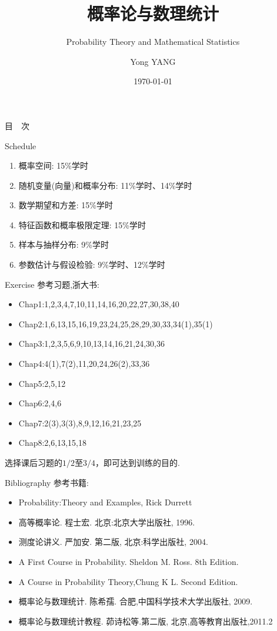 \documentclass[aspectratio=43]{beamer}
\title{概率论与数理统计} %
\subtitle{Probability Theory and Mathematical Statistics}
\author[YY]{Yong YANG}
\institute[BUPT]{
	School of Information and Communication Engineering%
	\\%
	Beijing University of Posts and Telecommunications%
} %
\date{\today}%
\begin{document}
	
	\frame{\titlepage}
	\begin{frame}{目$\quad$次}
	\tableofcontents   
\end{frame}

\begin{frame}{Schedule}
\begin{enumerate}
	\item \alert{概率空间}: 15\%学时
	\item \alert{随机变量(向量)和概率分布}: 11\%学时、14\%学时
	\item \alert{数学期望和方差}: 15\%学时
	\item \alert{特征函数和概率极限定理}: 15\%学时
	\item \alert{样本与抽样分布}: 9\%学时
	\item \alert{参数估计与假设检验}: 9\%学时、12\%学时
\end{enumerate}
\end{frame}

	\begin{frame}{Exercise}
	参考习题,浙大书:
	
	\begin{itemize}
		\item Chap1:1,2,3,4,7,10,11,14,16,20,22,27,30,38,40
		\item Chap2:1,6,13,15,16,19,23,24,25,28,29,30,33,34(1),35(1)
		\item Chap3:1,2,3,5,6,9,10,13,14,16,21,24,30,36
		\item Chap4:4(1),7(2),11,20,24,26(2),33,36
		\item Chap5:2,5,12
		\item Chap6:2,4,6
		\item Chap7:2(3),3(3),8,9,12,16,21,23,25
		\item Chap8:2,6,13,15,18
	\end{itemize}
	选择课后习题的$1/2$至$3/4$，即可达到训练的目的.
    \end{frame}

	\begin{frame}{Bibliography}
	参考书籍:
	\begin{itemize}
		\item Probability:Theory and Examples, Rick Durrett
		\item 高等概率论. 程士宏. 北京:北京大学出版社, 1996.
		\item 测度论讲义. 严加安. 第二版, 北京:科学出版社, 2004.
		\item A First Course in Probability. Sheldon M. Ross. 8th Edition.
		\item A Course in Probability Theory,Chung K L. Second Edition.
		\item 概率论与数理统计. 陈希孺. 合肥,中国科学技术大学出版社, 2009.
		\item 概率论与数理统计教程. 茆诗松等.第二版, 北京,高等教育出版社,2011.2
	\end{itemize}
	\end{frame}







\end{document}
